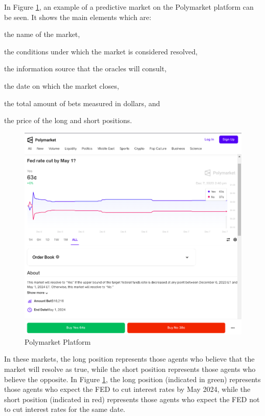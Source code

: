 In Figure \ref{fig:polymarket}, an example of a predictive market on the Polymarket platform can be seen. It shows the main elements which are: \begin{enumerate*}[label=(\roman*)]
\item the name of the market,
\item the conditions under which the market is considered resolved,
\item the information source that the oracles will consult,
\item the date on which the market closes,
\item the total amount of bets measured in dollars, and
\item the price of the long and short positions.
\end{enumerate*}

\begin{figure}[htbp]
    \centering
    \includegraphics[scale=0.4]{img/polymarket.png}
    \caption{Polymarket Platform}
    \label{fig:polymarket}
\end{figure}

In these markets, the long position represents those agents who believe that the market will resolve as true, while the short position represents those agents who believe the opposite. In Figure \ref{fig:polymarket}, the long position (indicated in green) represents those agents who expect the FED to cut interest rates by May 2024, while the short position (indicated in red) represents those agents who expect the FED not to cut interest rates for the same date.
    

